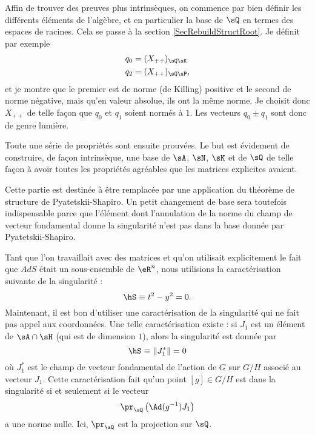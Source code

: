 Affin de trouver des preuves plus intrinsèques, on commence par bien définir les différents éléments de l'algèbre, et en particulier la base de $\sQ$ en termes des espaces de racines. Cela se passe à la section \ref{SecRebuildStructRoot}. Je définit par exemple
\begin{equation}
	\begin{aligned}[]
		q_0&=(X_{++})_{\sQ\sK}\\
		q_2&=(X_{++})_{\sQ\sP},
	\end{aligned}
\end{equation}
et je montre que le premier est de norme (de Killing) positive et le second de norme négative, mais qu'en valeur absolue, ils ont la même norme. Je choisit donc $X_{++}$ de telle façon que $q_0$ et $q_1$ soient normés à $1$. Les vecteurs $q_0\pm q_1$ sont donc de genre lumière.

Toute une série de propriétés sont ensuite prouvées. Le but est évidement de construire, de façon intrinsèque, une base de $\sA$, $\sN$, $\sK$ et de $\sQ$ de telle façon à avoir toutes les propriétés agréables que les matrices explicites avaient.

Cette partie est destinée à être remplacée par une application du théorème de structure de Pyatetskii-Shapiro. Un petit changement de base sera toutefois indispensable parce que l'élément dont l'annulation de la norme du champ de vecteur fondamental donne la singularité n'est pas dans la base donnée par Pyatetskii-Shapiro.

Tant que l'on travaillait avec des matrices et qu'on utilisait explicitement le fait que $AdS$ était un sous-ensemble de $\eR^n$, nous utilisions la caractérisation suivante de la singularité :
\begin{equation}
	\hS\equiv t^2-y^2=0.
\end{equation}
Maintenant, il est bon d'utiliser une caractérisation de la singularité qui ne fait pas appel aux coordonnées. Une telle caractérisation existe : si $J_1$ est un élément de $\sA\cap\sH$ (qui est de dimension $1$), alors la singularité est donnée par
\begin{equation}
	\hS\equiv \| J_1^* \|=0
\end{equation}
où $J_1^*$ est le champ de vecteur fondamental de l'action de $G$ sur $G/H$ associé au vecteur $J_1$. Cette caractérisation fait qu'un point $[g]\in G/H$ est dans la singularité si et seulement si le vecteur
\begin{equation}		\label{VisiteEqprQcaract}
	\pr_{\sQ}\left( \Ad(g^{-1})J_1 \right)
\end{equation}
a une norme nulle. Ici, $\pr_{\sQ}$ est la projection sur $\sQ$.

